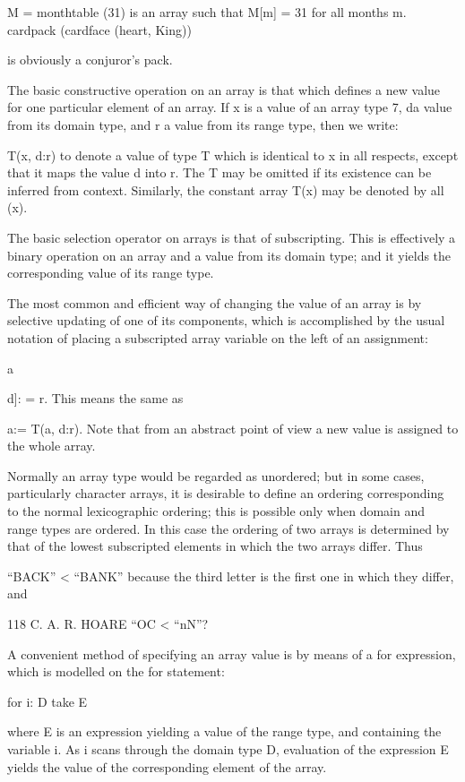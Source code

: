 {{		M = monthtable (31) is an array such that M[m] = 31 for all months m. cardpack (cardface (heart, King))
		
		is obviously a conjuror’s pack.
		
		The basic constructive operation on an array is that which defines a new value for one particular element of an array. If x is a value of an array type 7, da value from its domain type, and r a value from its range type, then we write:
		
		T(x, d:r) to denote a value of type T which is identical to x in all respects, except that it maps the value d into r. The T may be omitted if its existence can be inferred from context. Similarly, the constant array T(x) may be denoted by all (x).
		
		The basic selection operator on arrays is that of subscripting. This is effectively a binary operation on an array and a value from its domain type; and it yields the corresponding value of its range type.
		
		The most common and efficient way of changing the value of an array is by selective updating of one of its components, which is accomplished by the usual notation of placing a subscripted array variable on the left of an assignment:
		
		a{d]: = r. This means the same as
			
			a:= T(a, d:r). Note that from an abstract point of view a new value is assigned to the whole array.
			
			Normally an array type would be regarded as unordered; but in some cases, particularly character arrays, it is desirable to define an ordering corresponding to the normal lexicographic ordering; this is possible only when domain and range types are ordered. In this case the ordering of two arrays is determined by that of the lowest subscripted elements in which the two arrays differ. Thus
			
			“BACK” < “BANK” because the third letter is the first one in which they differ, and
			
			118 C. A. R. HOARE “OC < “nN”?
			
			A convenient method of specifying an array value is by means of a for expression, which is modelled on the for statement:
			
			for i: D take E
			
			where E is an expression yielding a value of the range type, and containing the variable i. As i scans through the domain type D, evaluation of the expression E yields the value of the corresponding element of the array.
			
}}}
